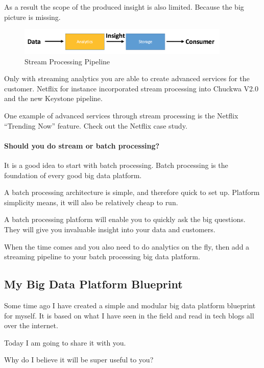 \documentclass[12pt]{scrartcl} %
\begin{document}
As a result the scope of the produced insight is also limited. Because the big picture is missing.

\begin{figure}[htbp]
  \centering
     \includegraphics[width=0.9\textwidth]{images/Simple-Stream-Processing-Workflow}
  \caption{Stream Processing Pipeline}
  \label{fig:Bild1}
\end{figure}

Only with streaming analytics you are able to create advanced services for the customer. Netflix for instance incorporated stream processing into Chuckwa V2.0 and the new Keystone pipeline.

One example of advanced services through stream processing is the Netflix “Trending Now” feature.
Check out the Netflix case study.

\paragraph{Should you do stream or batch processing?}

It is a good idea to start with batch processing. Batch processing is the foundation of every good big data platform.

A batch processing architecture is simple, and therefore quick to set up. Platform simplicity means, it will also be relatively cheap to run.

A batch processing platform will enable you to quickly ask the big questions. They will give you invaluable insight into your data and customers.

When the time comes and you also need to do analytics on the fly, then add a streaming pipeline to your batch processing big data platform.


\subsection {My Big Data Platform Blueprint}
Some time ago I have created a simple and modular big data platform blueprint for myself. It is based on what I have seen in the field and read in tech blogs all over the internet.

Today I am going to share it with you.

Why do I believe it will be super useful to you?
\end{document}
